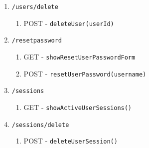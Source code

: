 \documentclass[12pt,DIV14,BCOR10mm,a4paper,parskip=half-,headsepline,headinclude,english,ngerman,bibliography=totocnumbered]{scrreprt}
\begin{document}
\begin{enumerate}
\begin{enumerate}
\begin{enumerate}
      \item \texttt{/users/delete}
      \begin{enumerate}
        \item POST - \texttt{deleteUser(userId)}
      \end{enumerate}
      \item \texttt{/resetpassword}
      \begin{enumerate}
        \item GET - \texttt{showResetUserPasswordForm}
        \item POST - \texttt{resetUserPassword(username)}
      \end{enumerate}
      \item \texttt{/sessions}
      \begin{enumerate}
        \item GET - \texttt{showActiveUserSessions()}
      \end{enumerate}
      \item \texttt{/sessions/delete}
      \begin{enumerate}
        \item POST - \texttt{deleteUserSession()}
      \end{enumerate}
    \end{enumerate}


\end{enumerate}
\end{enumerate}
\end{document}
